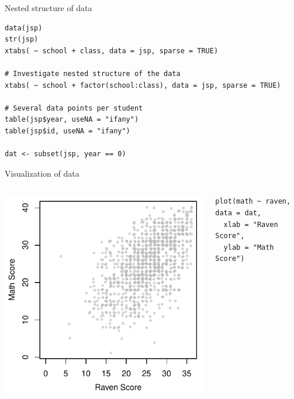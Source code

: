 \documentclass[aspectratio=169]{beamer}
\begin{document}
\begin{frame}[fragile]{Nested structure of data}
  \begin{lstlisting}
data(jsp)
str(jsp)
xtabs( ~ school + class, data = jsp, sparse = TRUE)

# Investigate nested structure of the data
xtabs( ~ school + factor(school:class), data = jsp, sparse = TRUE)

# Several data points per student
table(jsp$year, useNA = "ifany")
table(jsp$id, useNA = "ifany")

dat <- subset(jsp, year == 0)
  \end{lstlisting}
\end{frame}

\begin{frame}[fragile]{Visualization of data}
  \begin{columns}
    \begin{column}{.5\textwidth}
      \includegraphics[scale=.8]{../figures/jsp_scatter}
    \end{column}
    \begin{column}{.5\textwidth}
      \begin{lstlisting}
plot(math ~ raven, data = dat,
  xlab = "Raven Score",
  ylab = "Math Score")
      \end{lstlisting}
    \end{column}
  \end{columns}
\end{frame}
\end{document}
